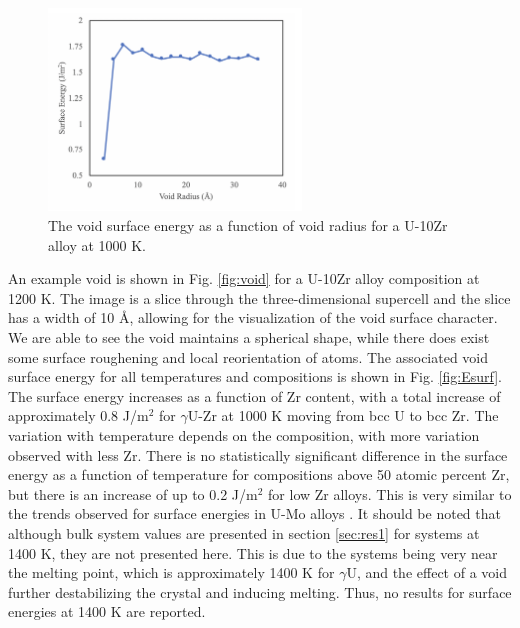\documentclass[review]{elsarticle}
\begin{document}
\begin{figure}[!htp]
\begin{center}
\includegraphics[width=0.6\textwidth]{6_size}
\end{center}
\caption{The void surface energy as a function of void radius for a U-10Zr alloy at 1000 K. }
\label{fig:size}
\end{figure}

An example void is shown in Fig. \ref{fig:void} for a U-10Zr alloy composition at 1200 K. The image is a slice through the three-dimensional supercell and the slice has a width of 10 \AA, allowing for the visualization of the void surface character. We are able to see the void maintains a spherical shape, while there does exist some surface roughening and local reorientation of atoms. The associated void surface energy for all temperatures and compositions is shown in Fig. \ref{fig:Esurf}. The surface energy increases as a function of Zr content, with a total increase of approximately 0.8 J/m$^2$ for $\gamma$U-Zr at 1000 K moving from bcc U to bcc Zr. The variation with temperature depends on the composition, with more variation observed with less Zr. There is no statistically significant difference in the surface energy as a function of temperature for compositions above 50 atomic percent Zr, but there is an increase of up to 0.2 J/m$^2$ for low Zr alloys. This is very similar to the trends observed for surface energies in U-Mo alloys \cite{beelerumo}. It should be noted that although bulk system values are presented in section \ref{sec:res1} for systems at 1400 K, they are not presented here. This is due to the systems being very near the melting point, which is approximately 1400 K for $\gamma$U, and the effect of a void further destabilizing the crystal and inducing melting. Thus, no results for surface energies at 1400 K are reported. 
\end{document}
